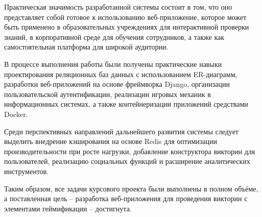 \documentclass[14pt,a4paper]{extreport}
\begin{document}
Практическая значимость разработанной системы состоит в том, что оно представляет собой готовое к использованию веб-приложение, которое может быть применено в образовательных учреждениях для интерактивной проверки знаний, в корпоративной среде для обучения сотрудников, а также как самостоятельная платформа для широкой аудитории.

В процессе выполнения работы были получены практические навыки проектирования реляционных баз данных с использованием ER-диаграмм, разработки веб-приложений на основе фреймворка Django, организации пользовательской аутентификации, реализации игровых механик в информационных системах, а также контейнеризации приложений средствами Docker.

Среди перспективных направлений дальнейшего развития системы следует выделить внедрение кэширования на основе Redis для оптимизации производительности при росте нагрузки, добавление конструктора викторин для пользователей, реализацию социальных функций и расширение аналитических инструментов.

Таким образом, все задачи курсового проекта были выполнены в полном объёме, а поставленная цель -- разработка веб-приложения для проведения викторин с элементами геймификации -- достигнута.
\end{document}
